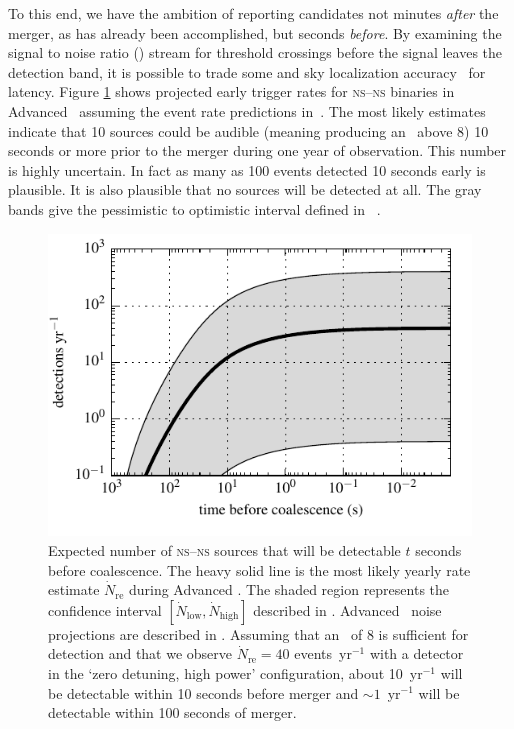 To this end, we have the ambition of reporting \GW{} candidates not minutes
\emph{after} the merger, as has already been accomplished, but seconds
\emph{before}.  By examining the signal to noise ratio (\SNR{}) stream for
threshold crossings before the \GW{} signal leaves the detection band, it is
possible to trade some \SNR{} and sky localization
accuracy~\cite{Fairhurst2009} for latency.  Figure \ref{fig:earlywarning} shows
projected early trigger rates for \textsc{ns}--\textsc{ns} binaries in Advanced
\LIGO\ assuming the event rate predictions in~\cite{Abadie:2010p10836}.  The
most likely estimates indicate that 10 sources could be audible (meaning
producing an \SNR\ above 8) 10 seconds or more prior to the merger during one
year of observation.  This number is highly uncertain.  In fact as many as 100
events detected 10 seconds early is plausible. It is also plausible that no
sources will be detected at all.  The gray bands give the pessimistic to
optimistic interval defined in ~\cite{Abadie:2010p10836}. 
%
\begin{figure}
\begin{center}
\includegraphics{figures/snr_in_time.pdf}
\caption{\label{fig:earlywarning} Expected number of \textsc{ns}--\textsc{ns}
sources that will be detectable $t$ seconds before coalescence.  The heavy
solid line is the most likely yearly rate estimate $\dot N_{\mathrm{re}}$
during Advanced \LIGO.  The shaded region represents the confidence interval
$[\dot N_{\mathrm{low}}, \dot N_{\mathrm{high}}]$ described in
\cite{Abadie:2010p10836}.  Advanced \LIGO\ noise projections are described in
\cite{ALIGONoise}.  Assuming that an \SNR\ of 8 is sufficient for detection and
that we observe $\dot N_{\mathrm{re}} = 40$ events~yr$^{-1}$ with a detector in
the `zero detuning, high power' configuration, about 10~yr$^{-1}$ will be
detectable within 10 seconds before merger and $\sim1$~yr$^{-1}$ will be
detectable within 100 seconds of merger.} 
\end{center}
\end{figure}

